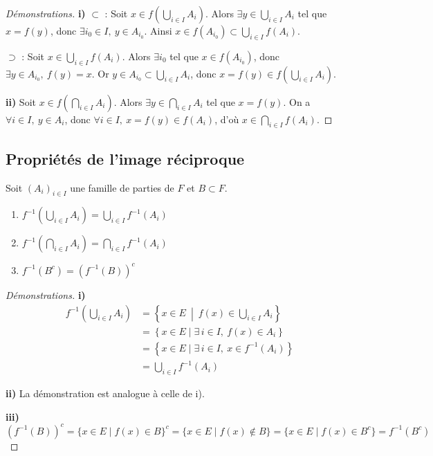 \begin{proof}[Démonstrations]
\textbf{i)} $\subset$ : Soit $x\in f\left(\bigcup_{i\in I}A_i\right)$. Alors $\exists y\in \displaystyle\bigcup_{i\in I}A_i$ tel que $x=f(y)$, donc $\exists i_0\in I,\ y\in A_{i_0}$. Ainsi $x\in f(A_{i_0})\subset \displaystyle\bigcup_{i\in I}f(A_i)$.

$\supset$ : Soit $x\in \displaystyle\bigcup_{i\in I}f(A_i)$. Alors $\exists i_0$ tel que $x\in f(A_{i_0})$, donc $\exists y\in A_{i_0},\ f(y)=x$. Or $y\in A_{i_0}\subset \displaystyle\bigcup_{i\in I}A_i$, donc $x=f(y)\in f\left(\displaystyle\bigcup_{i\in I}A_i\right)$.

\textbf{ii)} Soit $x\in f\left(\displaystyle\bigcap_{i\in I}A_i\right)$. Alors $\exists y\in\displaystyle\bigcap_{i\in I}A_i$ tel que $x=f(y)$. On a $\forall i\in I,\ y\in A_i$, donc $\forall i\in I,\ x=f(y)\in f(A_i)$, d'où $x\in\displaystyle\bigcap_{i\in I}f(A_i)$.
\end{proof}

\subsection{Propriétés de l'image réciproque}

\begin{prop}
\label{prop:image-reciproque}
Soit $(A_i)_{i\in I}$ une famille de parties de $F$ et $B\subset F$.
\begin{enumerate}
\item[i)] $f^{-1}\left(\displaystyle\bigcup_{i\in I} A_i\right) = \displaystyle\bigcup_{i\in I} f^{-1}(A_i)$
\item[ii)] $f^{-1}\left(\displaystyle\bigcap_{i\in I} A_i\right) = \displaystyle\bigcap_{i\in I} f^{-1}(A_i)$
\item[iii)] $f^{-1}(B^c) = \left(f^{-1}(B)\right)^c$
\end{enumerate}
\end{prop}

\begin{proof}[Démonstrations]
\textbf{i)}
\begin{align*}
f^{-1}\left(\bigcup_{i\in I}A_i\right)
&= \left\{x\in E \ \middle|\ f(x)\in \bigcup_{i\in I}A_i\right\} \\
&= \left\{x\in E \mid \exists\, i\in I,\ f(x)\in A_i\right\} \\
&= \left\{x\in E \mid \exists\, i\in I,\ x\in f^{-1}(A_i)\right\} \\
&= \bigcup_{i\in I}f^{-1}(A_i)
\end{align*}

\textbf{ii)} La démonstration est analogue à celle de i).

\textbf{iii)}
\[\left(f^{-1}(B)\right)^c = \{x\in E \mid f(x)\in B\}^c = \{x\in E \mid f(x)\notin B\} = \{x\in E \mid f(x)\in B^c\} = f^{-1}(B^c)\]
\end{proof}

